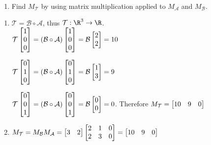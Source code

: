 \begin{exercises}
\begin{problist}
\begin{enumerate}
			\item Find $M_{\mathcal T}$ by using matrix multiplication applied
				to $M_{\mathcal A}$ and $M_{\mathcal B}$.
		\end{enumerate}
		
            \begin{enumerate}
                \item $\mathcal T = \mathcal B \circ \mathcal A$, thus $\mathcal T : \R^3 \to \R$. \\
                $\mathcal T \mat{1\\0\\0} 
                = (\mathcal B \circ \mathcal A) \mat{1\\0\\0}
                = \mathcal B \mat{2\\2} = 10$
                
                $\mathcal T \mat{0\\1\\0} 
                = (\mathcal B \circ \mathcal A) \mat{0\\1\\0}
                = \mathcal B \mat{1\\3} = 9$
                
                $\mathcal T \mat{0\\0\\1} 
                = (\mathcal B \circ \mathcal A) \mat{0\\0\\1}
                = \mathcal B \mat{0\\0} = 0$. Therefore $M_{\mathcal T} = \mat{10&9&0}$
                
                \item $M_{\mathcal T} = M_{\mathcal B} M_{\mathcal A}
                = \mat{3&2} \mat{2&1&0\\2&3&0} = \mat{10&9&0}$
            \end{enumerate}
	\end{problist}
\end{exercises}
